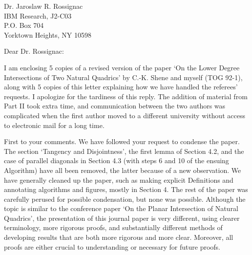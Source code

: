 \signature{John K. Johnstone\\jj@cs.jhu.edu}

\begin{letter}
{Dr. Jaroslaw R. Rossignac\\
IBM Research, J2-C03\\
P.O. Box 704\\
Yorktown Heights, NY  10598
}

\noindent \opening{Dear Dr. Rossignac:}

I am enclosing 5 copies of a revised version of the paper
`On the Lower Degree Intersections of Two Natural Quadrics'
by C.-K. Shene and myself (TOG 92-1),
along with 5 copies of this letter explaining how we have
handled the referees' requests.
I apologize for the tardiness of this reply.
The addition of material from Part II took extra time,
and communication between the two authors was complicated
when the first author moved to a different university
without access to electronic mail for a long time.


First to your comments.
We have followed your request to condense the paper.
The section `Tangency and Disjointness', 
the first lemma of Section 4.2, %
and the case of parallel diagonals in Section 4.3 (with steps 6 and 10
of the ensuing Algorithm) 
have all been removed, the latter because of a new observation.
We have generally cleaned up the paper, such as making explicit 
Definitions and annotating algorithms and figures, mostly in Section 4.
The rest of the paper was carefully perused for possible condensation,
but none was possible.
Although the topic is similar to the conference paper
`On the Planar Intersection of Natural Quadrics', 
the presentation of this journal paper is very different,
using clearer terminology, more rigorous proofs, and 
substantially different methods of developing results
that are both more rigorous and more clear.
Moreover, all proofs are either crucial to
understanding or necessary for future proofs.


	

\end{letter}
